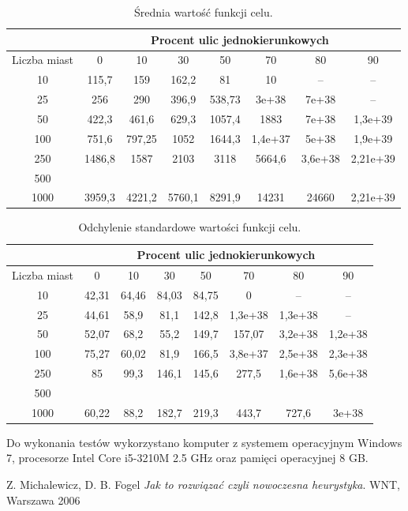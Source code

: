 \documentclass[11pt,a4paper,twoside]{article}
\begin{document}
\bgroup
\def\arraystretch{1.2}
\begin{table}[ht]
\centering
\begin{tabular}{|c|c|c|c|c|c|c|c|}
\hline
 & \multicolumn{7}{c|}{Procent ulic jednokierunkowych}\\\hline
Liczba miast & 0 & 10 & 30 & 50 & 70& 80& 90\\  \hline
10& 115,7& 159& 162,2& 81& 10& --& --\\ \hline
25& 256& 290& 396,9& 538,73& 3e+38& 7e+38& --\\ \hline
50& 422,3& 461,6& 629,3& 1057,4& 1883& 7e+38& 1,3e+39\\ \hline
100& 751,6& 797,25& 1052& 1644,3& 1,4e+37& 5e+38& 1,9e+39\\ \hline
250& 1486,8& 1587& 2103& 3118& 5664,6& 3,6e+38& 2,21e+39\\ \hline
500& & & & & & & \\ \hline
1000& 3959,3& 4221,2& 5760,1& 8291,9& 14231& 24660& 2,21e+39\\ \hline
\end{tabular}
\caption{Średnia wartość funkcji celu.}
\label{fCelu}
\end{table}
\egroup

\bgroup
\def\arraystretch{1.2}
\begin{table}[ht]
\centering
\begin{tabular}{|c|c|c|c|c|c|c|c|}
\hline
 & \multicolumn{7}{c|}{Procent ulic jednokierunkowych}\\\hline
Liczba miast & 0 & 10 & 30 & 50 & 70& 80& 90\\  \hline
10& 42,31& 64,46& 84,03& 84,75& 0& --& --\\ \hline
25& 44,61& 58,9& 81,1& 142,8& 1,3e+38& 1,3e+38& --\\ \hline
50& 52,07& 68,2& 55,2& 149,7& 157,07& 3,2e+38& 1,2e+38\\ \hline
100& 75,27& 60,02& 81,9& 166,5& 3,8e+37& 2,5e+38& 2,3e+38\\ \hline
250& 85& 99,3& 146,1& 145,6& 277,5& 1,6e+38& 5,6e+38\\ \hline
500& & & & & & & \\ \hline
1000& 60,22& 88,2& 182,7& 219,3& 443,7& 727,6& 3e+38\\ \hline
\end{tabular}
\caption{Odchylenie standardowe wartości funkcji celu.}
\label{odchyleniefCelu}
\end{table}
\egroup

Do wykonania testów wykorzystano komputer z systemem operacyjnym Windows 7, procesorze Intel Core i5-3210M 2.5 GHz oraz pamięci operacyjnej 8 GB. 

  
\begin{thebibliography}{9}
Z. Michalewicz, D. B. Fogel
\emph{Jak to rozwiązać czyli nowoczesna heurystyka}.
WNT, Warszawa 2006
\end{thebibliography}
\end{document}
